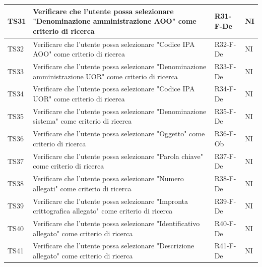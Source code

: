 \documentclass[a4paper,12pt]{article}
\begin{document}
\begin{longtable}{|M{1.2cm}|M{6.3cm}|M{2.5cm}|M{1.5cm}|}
                TS31 & Verificare che l'utente possa selezionare "Denominazione amministrazione AOO" come criterio di ricerca & R31-F-De & NI \\
                \hline

                TS32 & Verificare che l'utente possa selezionare "Codice IPA AOO" come criterio di ricerca & R32-F-De & NI \\
                \hline

                TS33 & Verificare che l'utente possa selezionare "Denominazione amministrazione UOR" come criterio di ricerca & R33-F-De & NI \\
                \hline

                TS34 & Verificare che l'utente possa selezionare "Codice IPA UOR" come criterio di ricerca & R34-F-De & NI \\
                \hline
                
                TS35 & Verificare che l'utente possa selezionare "Denominazione sistema" come criterio di ricerca & R35-F-De & NI \\
                \hline
                
                TS36 & Verificare che l'utente possa selezionare "Oggetto" come criterio di ricerca & R36-F-Ob & NI \\
                \hline
                
                TS37 & Verificare che l'utente possa selezionare "Parola chiave" come criterio di ricerca & R37-F-De & NI \\
                \hline
                
                TS38 & Verificare che l'utente possa selezionare "Numero allegati" come criterio di ricerca & R38-F-De & NI \\
                \hline
                
                TS39 & Verificare che l'utente possa selezionare "Impronta crittografica allegato" come criterio di ricerca & R39-F-De & NI \\
                \hline
                
                TS40 & Verificare che l'utente possa selezionare "Identificativo allegato" come criterio di ricerca & R40-F-De & NI \\
                \hline
                
                TS41 & Verificare che l'utente possa selezionare "Descrizione allegato" come criterio di ricerca & R41-F-De & NI \\
                \hline
                

\end{longtable}
\end{document}

